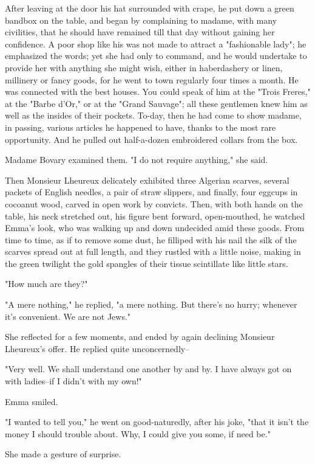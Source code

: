 \documentclass[11pt,twocolumn]{ltugboat}
\begin{document}
After leaving at the door his hat surrounded with crape, he put down
a green bandbox on the table, and began by complaining to madame, with
many civilities, that he should have remained till that day without
gaining her confidence. A poor shop like his was not made to attract
a "fashionable lady"; he emphasized the words; yet she had only to
command, and he would undertake to provide her with anything she might
wish, either in haberdashery or linen, millinery or fancy goods, for
he went to town regularly four times a month. He was connected with the
best houses. You could speak of him at the "Trois Freres," at the "Barbe
d'Or," or at the "Grand Sauvage"; all these gentlemen knew him as
well as the insides of their pockets. To-day, then he had come to show
madame, in passing, various articles he happened to have, thanks to
the most rare opportunity. And he pulled out half-a-dozen embroidered
collars from the box.

Madame Bovary examined them. "I do not require anything," she said.

Then Monsieur Lheureux delicately exhibited three Algerian scarves,
several packets of English needles, a pair of straw slippers, and
finally, four eggcups in cocoanut wood, carved in open work by convicts.
Then, with both hands on the table, his neck stretched out, his figure
bent forward, open-mouthed, he watched Emma's look, who was walking up
and down undecided amid these goods. From time to time, as if to remove
some dust, he filliped with his nail the silk of the scarves spread
out at full length, and they rustled with a little noise, making in the
green twilight the gold spangles of their tissue scintillate like little
stars.

"How much are they?"

"A mere nothing," he replied, "a mere nothing. But there's no hurry;
whenever it's convenient. We are not Jews."

She reflected for a few moments, and ended by again declining Monsieur
Lheureux's offer. He replied quite unconcernedly--

"Very well. We shall understand one another by and by. I have always got
on with ladies--if I didn't with my own!"

Emma smiled.

"I wanted to tell you," he went on good-naturedly, after his joke, "that
it isn't the money I should trouble about. Why, I could give you some,
if need be."

She made a gesture of surprise.
\end{document}
